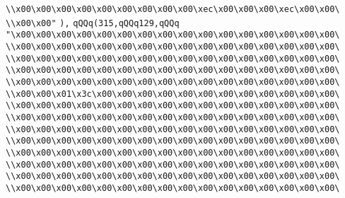 \verb|\\x00\x00\x00\x00\x00\x00\x00\x00\x00\xec\x00\x00\x00\xec\x00\x00\|\newline
\verb|\\x00\x00"|\newline
\verb|),|\newline
\verb|qQQq(315,qQQq129,qQQq|\newline
\verb|"\x00\x00\x00\x00\x00\x00\x00\x00\x00\x00\x00\x00\x00\x00\x00\x00\|\newline
\verb|\\x00\x00\x00\x00\x00\x00\x00\x00\x00\x00\x00\x00\x00\x00\x00\x00\|\newline
\verb|\\x00\x00\x00\x00\x00\x00\x00\x00\x00\x00\x00\x00\x00\x00\x00\x00\|\newline
\verb|\\x00\x00\x00\x00\x00\x00\x00\x00\x00\x00\x00\x00\x00\x00\x00\x00\|\newline
\verb|\\x00\x00\x00\x00\x00\x00\x00\x00\x00\x00\x00\x00\x00\x00\x00\x00\|\newline
\verb|\\x00\x00\x01\x3c\x00\x00\x00\x00\x00\x00\x00\x00\x00\x00\x00\x00\|\newline
\verb|\\x00\x00\x00\x00\x00\x00\x00\x00\x00\x00\x00\x00\x00\x00\x00\x00\|\newline
\verb|\\x00\x00\x00\x00\x00\x00\x00\x00\x00\x00\x00\x00\x00\x00\x00\x00\|\newline
\verb|\\x00\x00\x00\x00\x00\x00\x00\x00\x00\x00\x00\x00\x00\x00\x00\x00\|\newline
\verb|\\x00\x00\x00\x00\x00\x00\x00\x00\x00\x00\x00\x00\x00\x00\x00\x00\|\newline
\verb|\\x00\x00\x00\x00\x00\x00\x00\x00\x00\x00\x00\x00\x00\x00\x00\x00\|\newline
\verb|\\x00\x00\x00\x00\x00\x00\x00\x00\x00\x00\x00\x00\x00\x00\x00\x00\|\newline
\verb|\\x00\x00\x00\x00\x00\x00\x00\x00\x00\x00\x00\x00\x00\x00\x00\x00\|\newline
\verb|\\x00\x00\x00\x00\x00\x00\x00\x00\x00\x00\x00\x00\x00\x00\x00\x00\|\newline
